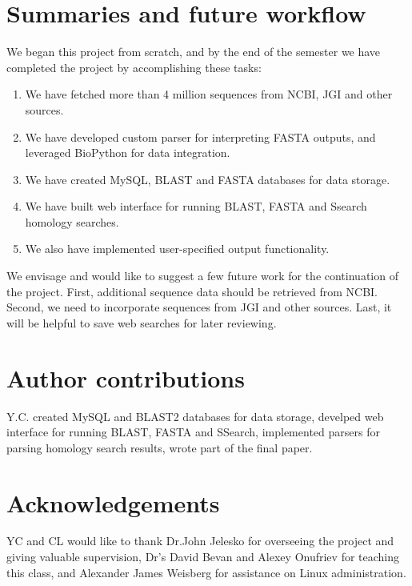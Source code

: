 \documentclass[11pt,letterpaper,twoside,english]{article}
\begin{document}
\section{Summaries and future workflow}

We began this project from scratch, and by the end of the semester
we have completed the project by accomplishing these tasks:
\begin{enumerate}
\item We have fetched more than 4 million sequences from NCBI, JGI and other
sources.
\item We have developed custom parser for interpreting FASTA outputs, and
leveraged BioPython for data integration.
\item We have created MySQL, BLAST and FASTA databases for data storage.
\item We have built web interface for running BLAST, FASTA and Ssearch homology
searches.
\item We also have implemented user-specified output functionality.
\end{enumerate}
We envisage and would like to suggest a few future work for the continuation
of the project. First, additional sequence data should be retrieved
from NCBI. Second, we need to incorporate sequences from JGI and other
sources. Last, it will be helpful to save web searches for later reviewing.


\section{Author contributions}

Y.C. created MySQL and BLAST2 databases for data storage, develped
web interface for running BLAST, FASTA and SSearch, implemented parsers
for parsing homology search results, wrote part of the final paper. 


\section{Acknowledgements}

YC and CL would like to thank Dr.John Jelesko for overseeing the project
and giving valuable supervision, Dr's David Bevan and Alexey Onufriev
for teaching this class, and Alexander James Weisberg for assistance
on Linux administration.



\end{document}
